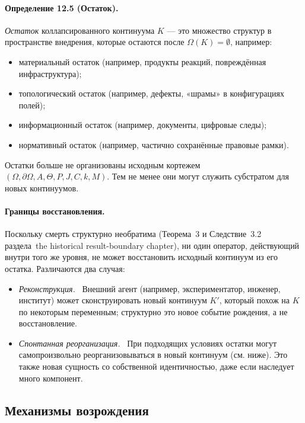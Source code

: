 \paragraph{Определение 12.5 (Остаток).}
\emph{Остаток} коллапсированного континуума \(K\) — это множество
структур в пространстве внедрения, которые остаются после
\(\Omega(K)=\emptyset\), например:
\begin{itemize}
  \item материальный остаток (например, продукты реакций, повреждённая
        инфраструктура);
  \item топологический остаток (например, дефекты, «шрамы» в конфигурациях
        полей);
  \item информационный остаток (например, документы, цифровые следы);
  \item нормативный остаток (например, частично сохранённые правовые рамки).
\end{itemize}

Остатки больше не организованы исходным кортежем
\((\Omega,\partial\Omega,A,\Theta,P,J,C,k,M)\). Тем не менее они могут
служить субстратом для новых континуумов.

\paragraph{Границы восстановления.}
Поскольку смерть структурно необратима
(Теорема~3 и Следствие~3.2 раздела~the historical result-boundary chapter), ни один оператор,
действующий внутри того же уровня, не может восстановить исходный континуум
из его остатка. Различаются два случая:
\begin{itemize}
  \item \emph{Реконструкция.} \
        Внешний агент (например, экспериментатор, инженер, институт) может
        сконструировать новый континуум \(K'\), который похож на \(K\) по
        некоторым переменным; структурно это новое событие рождения, а не
        восстановление.
  \item \emph{Спонтанная реорганизация.} \
        При подходящих условиях остатки могут самопроизвольно реорганизовываться
        в новый континуум (см. ниже). Это также новая сущность со собственной
        идентичностью, даже если наследует много компонент.
\end{itemize}

\subsection{Механизмы возрождения}

